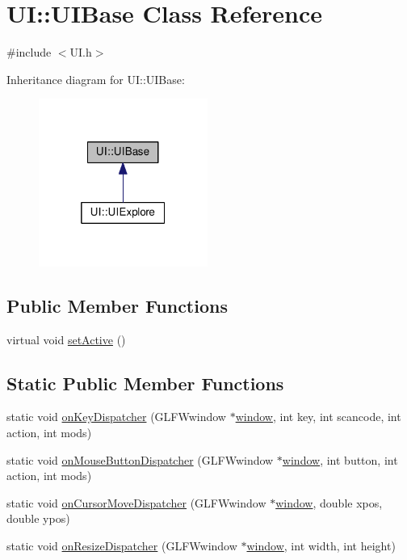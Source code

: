 \hypertarget{class_u_i_1_1_u_i_base}{}\section{UI\+:\+:U\+I\+Base Class Reference}
\label{class_u_i_1_1_u_i_base}


{\ttfamily \#include $<$U\+I.\+h$>$}



Inheritance diagram for UI\+:\+:U\+I\+Base\+:\nopagebreak
\begin{figure}[H]
\begin{center}
\leavevmode
\includegraphics[width=157pt]{class_u_i_1_1_u_i_base__inherit__graph}
\end{center}
\end{figure}
\subsection*{Public Member Functions}
\begin{DoxyCompactItemize}
\item 
virtual void \hyperlink{class_u_i_1_1_u_i_base_a795c1f2aad98bf128515a8033af63aa7}{set\+Active} ()
\end{DoxyCompactItemize}
\subsection*{Static Public Member Functions}
\begin{DoxyCompactItemize}
\item 
static void \hyperlink{class_u_i_1_1_u_i_base_a5f82346e3b961a1cec579692d02dfee7}{on\+Key\+Dispatcher} (G\+L\+F\+Wwindow $\ast$\hyperlink{namespace_u_i_ac05ba8c1833c723ee85c762399654d3e}{window}, int key, int scancode, int action, int mods)
\item 
static void \hyperlink{class_u_i_1_1_u_i_base_a40fb9f20db942544fe2b8ae8436524a2}{on\+Mouse\+Button\+Dispatcher} (G\+L\+F\+Wwindow $\ast$\hyperlink{namespace_u_i_ac05ba8c1833c723ee85c762399654d3e}{window}, int button, int action, int mods)
\item 
static void \hyperlink{class_u_i_1_1_u_i_base_a3de0a954520fd587e10fa47f93d8a937}{on\+Cursor\+Move\+Dispatcher} (G\+L\+F\+Wwindow $\ast$\hyperlink{namespace_u_i_ac05ba8c1833c723ee85c762399654d3e}{window}, double xpos, double ypos)
\item 
static void \hyperlink{class_u_i_1_1_u_i_base_af3d73d8afcd634826fc28e7b831f67b8}{on\+Resize\+Dispatcher} (G\+L\+F\+Wwindow $\ast$\hyperlink{namespace_u_i_ac05ba8c1833c723ee85c762399654d3e}{window}, int width, int height)
\end{DoxyCompactItemize}


